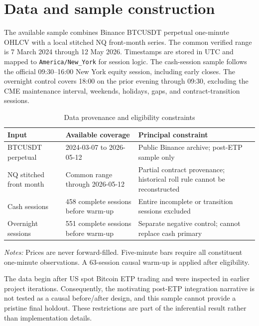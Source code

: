 \documentclass[11pt]{article}
\begin{document}
\section{Data and sample construction}

The available sample combines Binance BTCUSDT perpetual one-minute OHLCV with a local
stitched NQ front-month series. The common verified range is 7 March 2024 through
12 May 2026. Timestamps are stored in UTC and mapped to \texttt{America/New\_York} for
session logic. The cash-session sample follows the official 09:30--16:00 New York equity
session, including early closes. The overnight control covers 18:00 on the prior evening
through 09:30, excluding the CME maintenance interval, weekends, holidays, gaps, and
contract-transition sessions.

\begin{table}[!htbp]
  \centering
  \caption{Data provenance and eligibility constraints}
  \label{tab:data}
  \small
  \begin{tabular}{L{0.20\textwidth}L{0.28\textwidth}L{0.39\textwidth}}
    \toprule
    Input & Available coverage & Principal constraint \\
    \midrule
    BTCUSDT perpetual & 2024-03-07 to 2026-05-12 & Public Binance archive; post-ETP sample only \\
    NQ stitched front month & Common range through 2026-05-12 & Partial contract provenance; historical roll rule cannot be reconstructed \\
    Cash sessions & 458 complete sessions before warm-up & Entire incomplete or transition sessions excluded \\
    Overnight sessions & 551 complete sessions before warm-up & Separate negative control; cannot replace cash primary \\
    \bottomrule
  \end{tabular}
  \par\vspace{2pt}
  \parbox{0.90\textwidth}{\footnotesize\textit{Notes:} Prices are never forward-filled.
  Five-minute bars require all constituent one-minute observations. A 63-session causal
  warm-up is applied after eligibility.}
\end{table}

The data begin after US spot Bitcoin ETP trading and were inspected in earlier project
iterations. Consequently, the motivating post-ETP integration narrative is not tested as
a causal before/after design, and this sample cannot provide a pristine final holdout.
These restrictions are part of the inferential result rather than implementation details.
\end{document}

